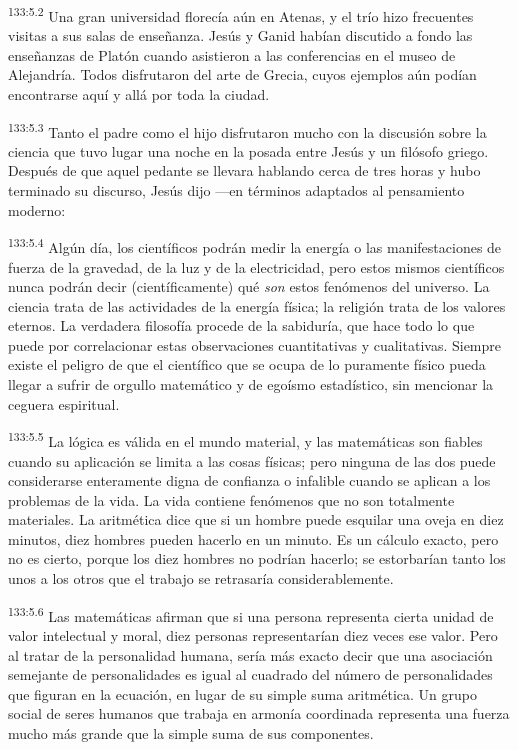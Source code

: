 \par
\textsuperscript{133:5.2} Una gran universidad florecía aún en Atenas, y el trío hizo frecuentes visitas a sus salas de enseñanza. Jesús y Ganid habían discutido a fondo las enseñanzas de Platón cuando asistieron a las conferencias en el museo de Alejandría. Todos disfrutaron del arte de Grecia, cuyos ejemplos aún podían encontrarse aquí y allá por toda la ciudad.

\par
\textsuperscript{133:5.3} Tanto el padre como el hijo disfrutaron mucho con la discusión sobre la ciencia que tuvo lugar una noche en la posada entre Jesús y un filósofo griego. Después de que aquel pedante se llevara hablando cerca de tres horas y hubo terminado su discurso, Jesús dijo ---en términos adaptados al pensamiento moderno:

\par
\textsuperscript{133:5.4} Algún día, los científicos podrán medir la energía o las manifestaciones de fuerza de la gravedad, de la luz y de la electricidad, pero estos mismos científicos nunca podrán decir (científicamente) qué \textit{son} estos fenómenos del universo. La ciencia trata de las actividades de la energía física; la religión trata de los valores eternos. La verdadera filosofía procede de la sabiduría, que hace todo lo que puede por correlacionar estas observaciones cuantitativas y cualitativas. Siempre existe el peligro de que el científico que se ocupa de lo puramente físico pueda llegar a sufrir de orgullo matemático y de egoísmo estadístico, sin mencionar la ceguera espiritual.

\par
\textsuperscript{133:5.5} La lógica es válida en el mundo material, y las matemáticas son fiables cuando su aplicación se limita a las cosas físicas; pero ninguna de las dos puede considerarse enteramente digna de confianza o infalible cuando se aplican a los problemas de la vida. La vida contiene fenómenos que no son totalmente materiales. La aritmética dice que si un hombre puede esquilar una oveja en diez minutos, diez hombres pueden hacerlo en un minuto. Es un cálculo exacto, pero no es cierto, porque los diez hombres no podrían hacerlo; se estorbarían tanto los unos a los otros que el trabajo se retrasaría considerablemente.

\par
\textsuperscript{133:5.6} Las matemáticas afirman que si una persona representa cierta unidad de valor intelectual y moral, diez personas representarían diez veces ese valor. Pero al tratar de la personalidad humana, sería más exacto decir que una asociación semejante de personalidades es igual al cuadrado del número de personalidades que figuran en la ecuación, en lugar de su simple suma aritmética. Un grupo social de seres humanos que trabaja en armonía coordinada representa una fuerza mucho más grande que la simple suma de sus componentes.

